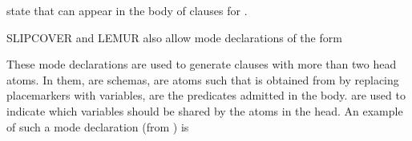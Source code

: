 \documentclass[letterpaper,10pt,english]{sphinxmanual}
\begin{document}
\sphinxAtStartPar
state that  can appear in the body of clauses for .

\sphinxAtStartPar
SLIPCOVER and LEMUR also allow mode declarations of the form

\begin{sphinxVerbatim}[commandchars=\\\{\}]
\PYG{p}{[}\PYG{p}{]}\PYG{p}{[}\PYG{p}{]}\PYG{p}{[}\PYG{p}{]}
\end{sphinxVerbatim}

\sphinxAtStartPar
These mode declarations are used to generate clauses with more than two head atoms.
In them,  are schemas,  are atoms such that  is obtained from  by replacing placemarkers with variables,  are the predicates admitted in the body.  are used to indicate which variables should be shared by the atoms in the head.
An example of such a mode declaration (from ) is
\end{document}
